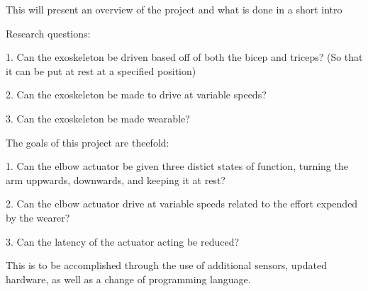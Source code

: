     This will present an overview of the project and what is done in a short intro


Research questions:

1.	Can the exoskeleton be driven based off of both the bicep and triceps? (So that it can be put at rest at a specified position)

2.	Can the exoskeleton be made to drive at variable speeds?

3.	Can the exoskeleton be made wearable?


The goals of this project are theefold:

1. Can the elbow actuator be given three distict states of function, turning the arm uppwards, downwards, and keeping it at rest?

2. Can the elbow actuator drive at variable speeds related to the effort expended by the wearer?

3. Can the latency of the actuator acting be reduced?

This is to be accomplished through the use of additional sensors, updated hardware, as well as a change of programming language.